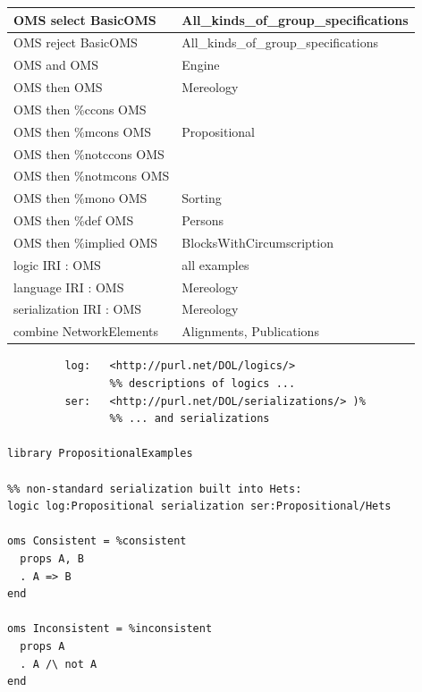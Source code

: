 \documentclass[10pt, a4paper]{isov2}
\begin{document}
\begin{tabular}{|l|l|}
OMS select BasicOMS  & All\_kinds\_of\_group\_specifications  \\\hline
OMS reject BasicOMS  & All\_kinds\_of\_group\_specifications \\\hline
OMS and OMS   & Engine \\\hline
OMS then OMS  & Mereology \\\hline
OMS then \%ccons OMS  &  \cite{DBLP:conf/ijcai/LutzWW07} \\\hline
OMS then \%mcons OMS  & Propositional \\\hline
OMS then \%notccons OMS  & \cite{DBLP:conf/ijcai/LutzWW07} \\\hline
OMS then \%notmcons OMS  & \cite{DBLP:conf/ijcai/LutzWW07} \\\hline
OMS then \%mono OMS  & Sorting \\\hline
OMS then \%def OMS  & Persons \\\hline
OMS then \%implied OMS  &  BlocksWithCircumscription \\\hline
logic IRI : OMS  &  all examples\\\hline
language IRI : OMS  &  Mereology\\\hline
serialization IRI : OMS  & Mereology \\\hline
combine NetworkElements  & Alignments, Publications \\\hline
\end{tabular}


\label{ex:prop}
\begin{lstlisting}[basicstyle=\ttfamily,language=dolText,alsolanguage=prop,escapechar=@,mathescape]
%prefix( :      <http://www.example.org/prop#>
         log:   <http://purl.net/DOL/logics/>
                %% descriptions of logics ...
         ser:   <http://purl.net/DOL/serializations/> )%
                %% ... and serializations

library PropositionalExamples

%% non-standard serialization built into Hets: 
logic log:Propositional serialization ser:Propositional/Hets       

oms Consistent = %consistent
  props A, B
  . A => B
end

oms Inconsistent = %inconsistent
  props A
  . A /\ not A
end
\end{lstlisting}
\end{document}
